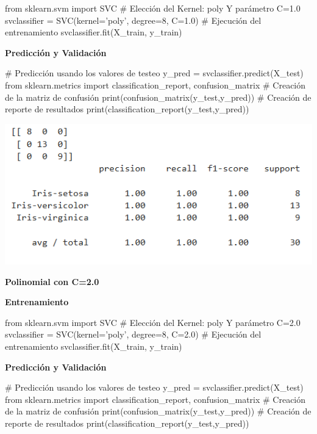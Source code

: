 \documentclass[paper=a4, fontsize=11pt]{scrartcl}
\numberwithin{equation}{section}		%
\numberwithin{figure}{section}			%
\numberwithin{table}{section}				%
\begin{document}
    \begin{python}
    from sklearn.svm import SVC
    # Elección del Kernel: poly Y parámetro C=1.0
    svclassifier = SVC(kernel='poly', degree=8, C=1.0)
    # Ejecución del entrenamiento
    svclassifier.fit(X_train, y_train)
    \end{python}
    
    \textbf{Predicción y Validación}
    
    \begin{python}
    # Predicción usando los valores de testeo
    y_pred = svclassifier.predict(X_test)
    from sklearn.metrics import classification_report, confusion_matrix
    # Creación de la matriz de confusión
    print(confusion_matrix(y_test,y_pred))
    # Creación de reporte de resultados
    print(classification_report(y_test,y_pred))
    \end{python}
    
    \includegraphics[scale=0.8]{polynomial_c_10}
    \newpage
    
    \textbf{Polinomial con C=2.0}
    
    \textbf{Entrenamiento}
    
    \begin{python}
    from sklearn.svm import SVC
    # Elección del Kernel: poly Y parámetro C=2.0
    svclassifier = SVC(kernel='poly', degree=8, C=2.0)
    # Ejecución del entrenamiento
    svclassifier.fit(X_train, y_train)
    \end{python}
    
    \textbf{Predicción y Validación}
    
    \begin{python}
    # Predicción usando los valores de testeo
    y_pred = svclassifier.predict(X_test)
    from sklearn.metrics import classification_report, confusion_matrix
    # Creación de la matriz de confusión
    print(confusion_matrix(y_test,y_pred))
    # Creación de reporte de resultados
    print(classification_report(y_test,y_pred))
    \end{python}
    
\end{document}
